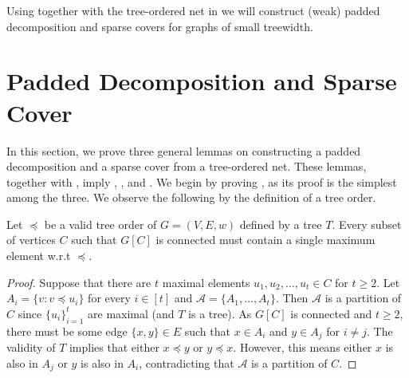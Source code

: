 \documentclass{article}
\begin{document}
Using  together with the tree-ordered net in  we will construct (weak) padded decomposition and sparse covers for graphs of small treewidth. 

\section{Padded Decomposition and Sparse Cover}\label{sec:centersToPadded}

In this section, we prove three general lemmas on constructing a padded decomposition and a sparse cover from a tree-ordered net. These lemmas, together with , imply , , and . We begin by proving , as its proof is the simplest among the three. We observe the following by the definition of a tree order.

\begin{observation}\label{obs:maximal} Let $\preceq$ be a valid tree order of $G = (V,E,w)$ defined by a tree $T$. Every subset of vertices $C$ such that $G[C]$ is connected must contain a single maximum element w.r.t $\preceq$.
\end{observation}
\begin{proof}
	Suppose that there are $t$ maximal elements $u_1,u_2,\ldots, u_t\in C$ for $t\geq 2$. Let  $A_i = \{v: v\preceq u_i\}$ for every $i\in [t]$ and  $\mathcal{A} = \{A_1,\ldots, A_t\}$. Then $\mathcal{A}$ is a partition of $C$ since $\{u_i\}_{i=1}^t$ are maximal (and $T$ is a tree). As $G[C]$ is connected and $t\geq 2$, there must be some edge $\{x,y\}\in E$ such that $x\in A_i$ and $y\in A_j$ for $i\not= j$. The validity of $T$ implies that either $x\preceq y$ or $y\preceq x$. However, this means either $x$ is also in $A_j$ or $y$ is also in $A_i$, contradicting that $\mathcal{A}$ is a partition of $C$. 
\end{proof}
\end{document}
